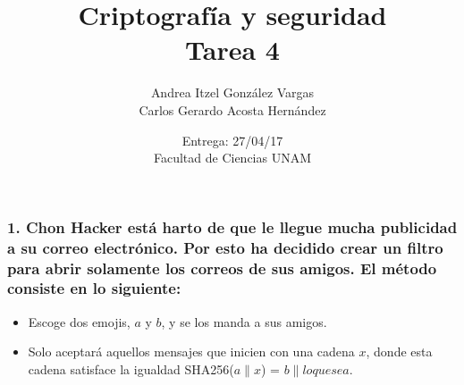 \documentclass[14pt]{article}
\title{Criptografía y seguridad \\ Tarea 4}
\author{Andrea Itzel González Vargas \\ Carlos Gerardo Acosta Hernández}
\date{Entrega: 27/04/17 \\ Facultad de Ciencias UNAM}
\begin{document}
\maketitle

\subsubsection*{1. Chon Hacker está harto de que le llegue mucha publicidad a su correo electrónico. Por esto ha decidido crear un filtro para abrir solamente los correos de sus amigos. El método consiste en lo siguiente:}
\begin{itemize}
\item Escoge dos emojis, $a$ y $b$, y se los manda a sus amigos.
\item Solo aceptará aquellos mensajes que inicien con una cadena $x$, donde esta cadena satisface la igualdad SHA256($a \parallel x$) = $b \parallel loquesea$.
\end{itemize}
\end{document}
